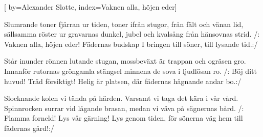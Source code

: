 

[
by={Alexander Slotte},
index={Vaknen alla, höjen eder}]

\beginverse* 
Slumrande toner fjärran ur tiden,
toner ifrån stugor, från fält och vänan lid,
sällsamma röster ur gravarnas dunkel,
jubel och kvalsång från hänsovnas strid.
/: Vaknen alla, höjen eder! Fädernas budskap
I bringen till söner, till lysande tid.:/
\endverse

\beginverse* 
Står inunder rönnen lutande stugan,
mossbeväxt är trappan och ogräsen gro. 
Innanför rutornas gröngamla stängsel 
minnena de sova i ljudlösan ro.
/: Böj ditt huvud! Träd försiktigt! Helig är platsen,
där fädernas hägnande andar bo.:/
\endverse

\beginverse* 
Slocknande kolen vi tända på härden.
Varsamt vi taga det kära i vår vård. 
Spinnrocken surrar vid lågande brasan,
medan vi väva på sägnernas bård.
/: Flamma forneld! Lys vår gärning! Lys genom tiden,
för sönerna väg hem till fädernas gård!:/
\endverse
\endsong


